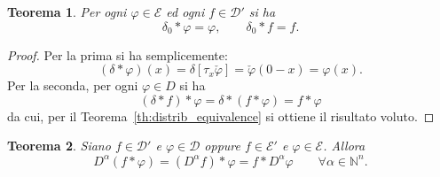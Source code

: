 \documentclass[italian,a4paper,oneside,headinclude]{scrbook}
\renewcommand{\phi}{\varphi}
\newcommand{\D}{\mathcal D}
\newcommand{\E}{\mathcal E}
\newcommand{\NN}{\mathbb N}
\newtheorem{theorem}{Teorema}
\begin{document}
\begin{theorem}
Per ogni $\phi\in \E$ ed ogni $f\in \D'$ si ha
\[
\delta_0 * \phi = \phi, \qquad
\delta_0 *f = f.
\]
\end{theorem}
%
\begin{proof}
  Per la prima si ha semplicemente:
  \[
   (\delta * \phi) (x) = \delta[\tau_{x}\check \phi] =
  \check\phi(0-x) = \phi(x).
  \]
  Per la seconda, per ogni $\phi\in D$ si ha
  \[
  (\delta * f)*\phi = \delta * (f*\phi) = f*\phi
  \]
  da cui, per il Teorema~\ref{th:distrib_equivalence} si ottiene il
  risultato voluto.
\end{proof}

\begin{theorem}\label{th:Dconvol}
  Siano $f\in\D'$ e $\phi\in\D$ oppure $f\in \E'$ e $\phi \in \E$.
  Allora
  \[
  D^\alpha(f*\phi) = (D^\alpha f) * \phi = f * D^\alpha \phi \qquad
  \forall\alpha\in\NN^n.
  \]
\end{theorem}
%
\end{document}
